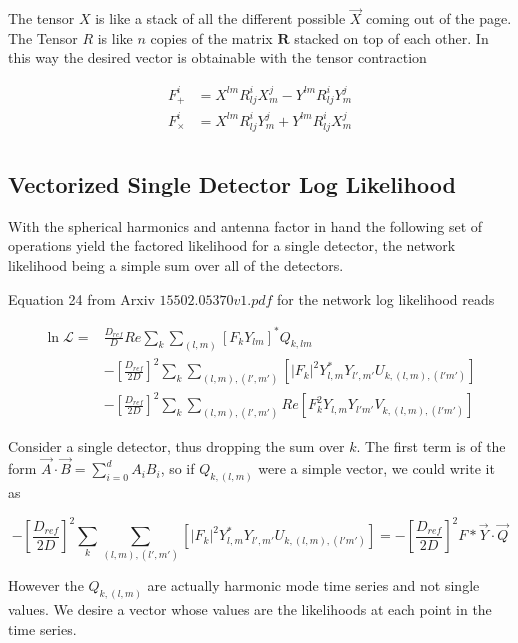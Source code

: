 \documentclass[paper=a4, fontsize=11pt]{scrartcl} %
\numberwithin{equation}{section} %
\numberwithin{figure}{section} %
\numberwithin{table}{section} %
\begin{document}
The tensor $X$ is like a stack of all the different possible $\vec{X}$ coming out of the page. The Tensor $R$ is like $n$ copies of the matrix $\mathbf{R}$ stacked on top of each other. In this way the desired vector is obtainable with the tensor contraction

\begin{align}
F^{i}_{+} &= X^{lm}R^{i}_{lj}X^{j}_{m} - Y^{lm}R^{i}_{lj}Y^{j}_{m} \\ 
F^{i}_{\times} &= X^{lm}R^{i}_{lj}Y^{j}_{m} + Y^{lm}R^{i}_{lj}X^{j}_{m} \\ 
\end{align}

\subsection{Vectorized Single Detector Log Likelihood}

With the spherical harmonics and antenna factor in hand the following set of operations yield the factored likelihood for a single detector, the network likelihood being a simple sum over all of the detectors.

Equation 24 from Arxiv $15502.05370v1.pdf$ for the network log likelihood reads 

\begin{align}
\ln{\mathcal{L}} = &\frac{D_{ref}}{D}Re \sum_{k}\sum_{(l,m)}\left[F_k Y_{lm}\right]^{*}Q_{k,lm} \\ 
& - \left[\frac{D_{ref}}{2D}\right]^{2}\sum_{k}\sum_{(l,m),(l',m')}\left[|F_k|^2 Y_{l,m}^{*}Y_{l',m'}U_{k,(l,m),(l'm')}\right] \\
 & - \left[\frac{D_{ref}}{2D}\right]^{2}\sum_{k}\sum_{(l,m),(l',m')}Re\left[  F_{k}^{2}Y_{l,m}Y_{l'm'}V_{k,(l,m),(l'm')}\right]
\end{align}

Consider a single detector, thus dropping the sum over $k$. The first term is of the form $\vec{A}\cdot\vec{B} = \sum_{i=0}^{d}A_iB_i$, so if $Q_{k,(l,m)}$ were a simple vector, we could write it as

\begin{equation}
- \left[\frac{D_{ref}}{2D}\right]^{2}\sum_{k}\sum_{(l,m),(l',m')}\left[|F_k|^2 Y_{l,m}^{*}Y_{l',m'}U_{k,(l,m),(l'm')}\right] = - \left[\frac{D_{ref}}{2D}\right]^{2} F*\vec{Y}\cdot\vec{Q}
\end{equation}

However the $Q_{k,(l,m)}$ are actually harmonic mode time series and not single values. We desire a vector whose values are the likelihoods at each point in the time series. 
\end{document}
